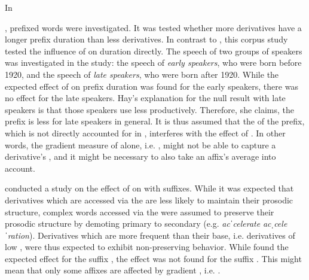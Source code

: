 {In {\citet{Hay.2007},  prefixed words were investigated. It was tested whether more  derivatives have a longer prefix duration than less   derivatives.  In contrast to \cite{Hay.2003}, this corpus study tested the influence of  on duration directly. The speech of two groups of speakers was investigated in the study: the speech of \textit{early speakers}, who were born before 1920, and the speech of \textit{late speakers}, who were born after 1920. 
While the expected effect of  on prefix duration was found for the early speakers, there was no effect  for the late speakers. Hay's explanation for the null result with late speakers is that those speakers use  less productively. Therefore, she claims, the prefix is less  for late speakers in general. It is thus assumed that the  of the prefix, which is not directly accounted for in , interferes with the effect of . In other words, the gradient measure of  alone, i.e. , might not be able to capture a derivative's , and it might be necessary to also take an affix's average  into account.
 
 \cite{Collie.2008} conducted a study on the effect of  on  with suffixes. While it was expected that derivatives which are accessed via the  are less likely to maintain their prosodic structure, complex words accessed via the  were assumed to preserve their prosodic structure by demoting primary  to secondary  (e.g. \textit{acˈcelerate} \textendash  \textit{acˌceleˈration}). Derivatives which are more frequent than their base, i.e. derivatives of low , were thus expected to exhibit non-preserving behavior. While \cite{Collie.2008} found the expected effect for the suffix , the effect was not found for the suffix . This might mean that only some affixes are affected by gradient , i.e. .
 	
}}
